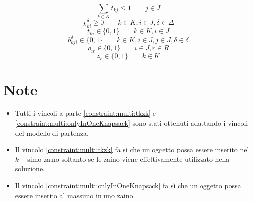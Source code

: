 \documentclass{scrartcl}
\begin{document}
\begin{equation}
\label{constraint:multi:onlyInOneKnapsack}
\sum_{k \in K} t_{kj} \leq 1 \quad \quad j \in J
\end{equation}
\begin{equation}
\chi_{ki}^\delta \geq 0 \quad \quad k \in K, i \in J, \delta \in \Delta
\end{equation}
\begin{equation}
t_{ki} \in \{0,1\} \quad \quad k \in K, i \in J
\end{equation}
\begin{equation}
b_{kji}^\delta \in \{0,1\} \quad \quad k \in K, i \in J, j \in J, \delta \in \delta
\end{equation}
\begin{equation}
\rho_{ir} \in \{0,1\} \quad\quad i \in J, r \in R
\end{equation}
\begin{equation}
z_k \in \{0,1\} \quad \quad k \in K
\end{equation}

\section{Note}
\begin{itemize}
\item Tutti i vincoli a parte \ref{constraint:multi:tkzk} e \ref{constraint:multi:onlyInOneKnapsack} sono stati ottenuti adattando i vincoli del modello di partenza.
\item Il vincolo \ref{constraint:multi:tkzk} fa sì che un oggetto possa essere inserito nel $k-$simo zaino soltanto se lo zaino viene effettivamente utilizzato nella soluzione.
\item Il vincolo \ref{constraint:multi:onlyInOneKnapsack} fa sì che un oggetto possa essere inserito al massimo in uno zaino. 
\end{itemize}
\end{document}
